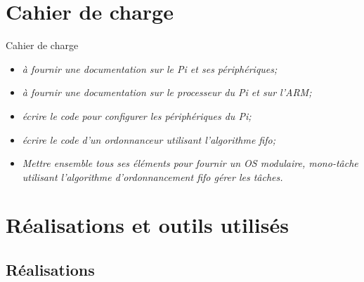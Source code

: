 \documentclass[french]{beamer}
\begin{document}
\section{Cahier de charge}
\begin{frame}
	\transsplitverticalout
\end{frame}

\begin{frame}{Cahier de charge}
\transsplitverticalin


\begin{beamerboxesrounded}[scheme=blocgrisclair]{}
	\begin{center}
		\begin{itemize}
			\color{nb}
			\large
			\item<1-> \textit{à fournir une documentation sur le Pi et ses périphériques;}
			\item<2-> \textit{à fournir une documentation sur le processeur du Pi et sur l'ARM;}
			\item<3-> \textit{écrire le code pour configurer les périphériques du Pi;}
			\item<4-> \textit{écrire le code d'un ordonnanceur utilisant l'algorithme fifo;}
			\item<5-> \textit{Mettre ensemble tous ses éléments pour fournir un OS modulaire, mono-tâche utilisant l'algorithme d'ordonnancement fifo gérer les tâches.}
		\end{itemize}
	\end{center}
\end{beamerboxesrounded}

\end{frame}


\section{Réalisations et outils utilisés}
\begin{frame}
	\transsplitverticalout
\end{frame}

\subsection{Réalisations}
\begin{frame}
	\transsplitverticalout
\end{frame}
\end{document}
